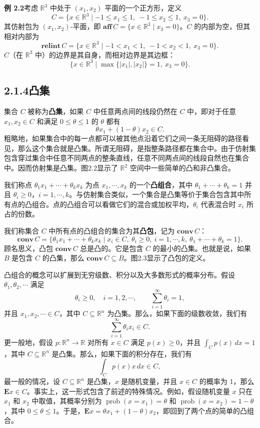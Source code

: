 \documentclass[UTF8, 12pt, fontset=fandol, oneside]{ctexart}
\begin{document}
\noindent\textbf{例 2.2}\quad 考虑 $\mathbb{R}^3$ 中处于 $(x_1,x_2)$ 平面的一个正方形，定义
\[
  C=\{x\in\mathbb{R}^3\mid -1\le x_1\le 1,\ -1\le x_2\le 1,\ x_3=0\}.
\]
其仿射包为 $(x_1,x_2)$-平面，即 $\mathbf{aff}\,C=\{x\in\mathbb{R}^3\mid x_3=0\}$。$C$ 的内部为空，但其相对内部为
\[
  \mathbf{relint}\,C=\{x\in\mathbb{R}^3\mid -1<x_1<1,\ -1<x_2<1,\ x_3=0\}.
\]
$C$（在 $\mathbb{R}^3$ 中）的边界是其自身，而相对边界是其边框：
\[
  \{x\in\mathbb{R}^3\mid \max\{|x_1|,|x_2|\}=1,\ x_3=0\}.
\]

\subsection*{2.1.4\quad 凸集}

集合 $C$ 被称为\textbf{凸集}，如果 $C$ 中任意两点间的线段仍然在 $C$ 中，即对于任意 $x_1,x_2\in C$ 和满足 $0\le\theta\le 1$ 的 $\theta$ 都有
\[
  \theta x_1+(1-\theta)x_2\in C.
\]
粗略地，如果集合中的每一点都可以被其他点沿着它们之间一条无阻碍的路径看见，那么这个集合就是凸集。所谓无阻碍，是指整条路径都在集合中。由于仿射集包含穿过集合中任意不同两点的整条直线，任意不同两点间的线段自然也在集合中。因而仿射集是凸集。图2.2显示了 $\mathbb{R}^2$ 空间中一些简单的凸和非凸集合。

我们称点 $\theta_1x_1+\cdots+\theta_kx_k$ 为点 $x_1,\cdots,x_k$ 的一个\textbf{凸组合}，其中 $\theta_1+\cdots+\theta_k=1$ 并且 $\theta_i\ge 0$，$i=1,\cdots,k$。与仿射集合类似，一个集合是凸集等价于集合包含其中所有点的凸组合。点的凸组合可以看做它们的混合或加权平均，$\theta_i$ 代表混合时 $x_i$ 所占的份数。

我们称集合 $C$ 中所有点的凸组合的集合为其\textbf{凸包}，记为 $\mathbf{conv}\,C$：
\[
  \mathbf{conv}\,C=\{\theta_1x_1+\cdots+\theta_kx_k\mid x_i\in C,\ \theta_i\ge 0,\ i=1,\cdots,k,\ \theta_1+\cdots+\theta_k=1\}.
\]
顾名思义，凸包 $\mathbf{conv}\,C$ 总是凸的。它是包含 $C$ 的最小的凸集。也就是说，如果 $B$ 是包含 $C$ 的凸集，那么 $\mathbf{conv}\,C\subseteq B$。图2.3显示了凸包的定义。

凸组合的概念可以扩展到无穷级数、积分以及大多数形式的概率分布。假设 $\theta_1,\theta_2,\cdots$ 满足
\[
  \theta_i\ge 0,\quad i=1,2,\cdots,\qquad
  \sum_{i=1}^{\infty}\theta_i=1,
\]
并且 $x_1,x_2,\cdots\in C$，其中 $C\subseteq\mathbb{R}^n$ 为凸集。那么，如果下面的级数收敛，我们有
\[
  \sum_{i=1}^{\infty}\theta_i x_i\in C.
\]
更一般地，假设 $p:\mathbb{R}^n\to\mathbb{R}$ 对所有 $x\in C$ 满足 $p(x)\ge 0$，并且 $\int_C p(x)\,dx=1$，其中 $C\subseteq\mathbb{R}^n$ 是凸集。那么，如果下面的积分存在，我们有
\[
  \int_C p(x)x\,dx\in C,
\]
最一般的情况，设 $C\subseteq\mathbb{R}^n$ 是凸集，$x$ 是随机变量，并且 $x\in C$ 的概率为 1，那么 $\mathbf{E}x\in C$。事实上，这一形式包含了前述的特殊情况。例如，假设随机变量 $x$ 只在 $x_1$ 和 $x_2$ 中取值，其概率分别为 $\operatorname{prob}(x=x_1)=\theta$ 和 $\operatorname{prob}(x=x_2)=1-\theta$，其中 $0\le\theta\le 1$。于是，$\mathbf{E}x=\theta x_1+(1-\theta)x_2$，即回到了两个点的简单的凸组合。
\end{document}
